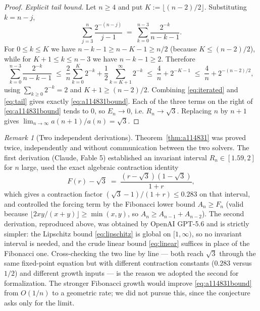 \documentclass[11pt]{article}
\theoremstyle{plain}
\theoremstyle{definition}
\theoremstyle{remark}
\newtheorem*{remark}{Remark}
\numberwithin{equation}{section}
\begin{document}
\begin{proof}
\emph{Explicit tail bound.} Let $n \ge 4$ and put $K := \lfloor (n-2)/2 \rfloor$. Substituting
$k = n-j$,
\[
  \sum_{j=3}^{n} \frac{2^{-(n-j)}}{j-1} \;=\; \sum_{k=0}^{n-3} \frac{2^{-k}}{n-k-1}.
\]
For $0 \le k \le K$ we have $n-k-1 \ge n-K-1 \ge n/2$ (because $K \le (n-2)/2$), while for
$K+1 \le k \le n-3$ we have $n-k-1 \ge 2$. Therefore
\begin{equation}
  \sum_{k=0}^{n-3} \frac{2^{-k}}{n-k-1}
  \;\le\; \frac2n \sum_{k=0}^{K} 2^{-k} + \frac12 \sum_{k=K+1}^{\infty} 2^{-k}
  \;\le\; \frac4n + 2^{-K-1}
  \;\le\; \frac4n + 2^{-(n-2)/2},
  \label{eq:tail}
\end{equation}
using $\sum_{k \ge 0} 2^{-k} = 2$ and $K+1 \ge (n-2)/2$. Combining \eqref{eq:iterated} and
\eqref{eq:tail} gives exactly \eqref{eq:a114831bound}. Each of the three terms on the right of
\eqref{eq:a114831bound} tends to $0$, so $E_n \to 0$, i.e. $R_n \to \sqrt3$. Replacing $n$ by
$n+1$ gives $\lim_{n\to\infty} a(n+1)/a(n) = \sqrt3$.
\end{proof}

\begin{remark}[Two independent derivations]
Theorem~\ref{thm:a114831} was proved twice, independently and without communication between the
two solvers. The first derivation (Claude, Fable 5) established an invariant interval
$R_n \in [1.59, 2]$ for $n$ large, used the exact algebraic contraction identity
\[
  F(r) - \sqrt3 \;=\; \frac{(r-\sqrt3)(1-\sqrt3)}{1+r},
\]
which gives a contraction factor $(\sqrt3-1)/(1+r) \le 0.283$ on that interval, and controlled
the forcing term by the Fibonacci lower bound $A_n \ge F_n$ (valid because
$\lfloor 2xy/(x+y) \rfloor \ge \min(x,y)$, so $A_n \ge A_{n-1}+A_{n-2}$). The second derivation,
reproduced above, was obtained by OpenAI GPT-5.6 and is strictly simpler: the Lipschitz bound
\eqref{eq:lipschitz} is global on $[1,\infty)$, so no invariant interval is needed, and the
crude linear bound \eqref{eq:linear} suffices in place of the Fibonacci one. Cross-checking the
two line by line --- both reach $\sqrt3$ through the same fixed-point equation but with
different contraction constants ($0.283$ versus $1/2$) and different growth inputs --- is the
reason we adopted the second for formalization. The stronger Fibonacci growth would improve
\eqref{eq:a114831bound} from $O(1/n)$ to a geometric rate; we did not pursue this, since the
conjecture asks only for the limit.
\end{remark}
\end{document}
